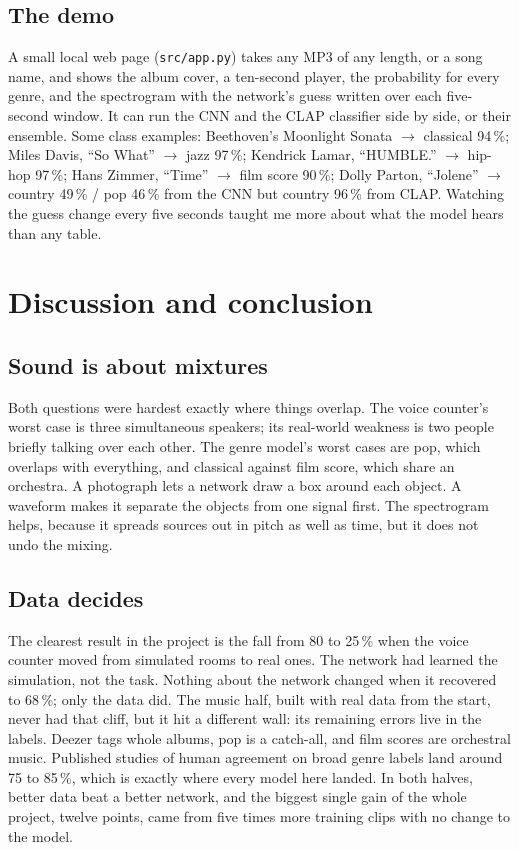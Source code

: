 \documentclass[11pt]{article}
\begin{document}
\subsection{The demo}
A small local web page (\texttt{src/app.py}) takes any MP3 of any length, or a song name, and shows the album cover, a ten-second player, the probability for every genre, and the spectrogram with the network's guess written over each five-second window. It can run the CNN and the CLAP classifier side by side, or their ensemble. Some class examples: Beethoven's Moonlight Sonata $\to$ classical 94\,\%; Miles Davis, ``So What'' $\to$ jazz 97\,\%; Kendrick Lamar, ``HUMBLE.'' $\to$ hip-hop 97\,\%; Hans Zimmer, ``Time'' $\to$ film score 90\,\%; Dolly Parton, ``Jolene'' $\to$ country 49\,\% / pop 46\,\% from the CNN but country 96\,\% from CLAP. Watching the guess change every five seconds taught me more about what the model hears than any table.

\section{Discussion and conclusion}\label{sec:discussion}

\subsection{Sound is about mixtures}
Both questions were hardest exactly where things overlap. The voice counter's worst case is three simultaneous speakers; its real-world weakness is two people briefly talking over each other. The genre model's worst cases are pop, which overlaps with everything, and classical against film score, which share an orchestra. A photograph lets a network draw a box around each object. A waveform makes it separate the objects from one signal first. The spectrogram helps, because it spreads sources out in pitch as well as time, but it does not undo the mixing.

\subsection{Data decides}
The clearest result in the project is the fall from 80 to 25\,\% when the voice counter moved from simulated rooms to real ones. The network had learned the simulation, not the task. Nothing about the network changed when it recovered to 68\,\%; only the data did. The music half, built with real data from the start, never had that cliff, but it hit a different wall: its remaining errors live in the labels. Deezer tags whole albums, pop is a catch-all, and film scores are orchestral music. Published studies of human agreement on broad genre labels land around 75 to 85\,\%, which is exactly where every model here landed. In both halves, better data beat a better network, and the biggest single gain of the whole project, twelve points, came from five times more training clips with no change to the model.
\end{document}
